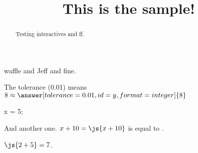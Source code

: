 \documentclass{ximera}
\title{This is the sample!}
\begin{document}
\begin{abstract}
Testing interactives and ff.
\end{abstract}

\maketitle

waffle and Jeff and fine.


 \begin{problem}
   The tolerance (0.01) means $8 \approx \answer[tolerance=0.01,id=y,format=integer]{8}$

   \begin{feedback}[72]
   \end{feedback}
 \end{problem}

\begin{javascript}
x = 5;
\end{javascript}

And another one.  $x + 10 = \js{x+10}$ is equal to .

$\js{2+5} = 7$.
\end{document}
